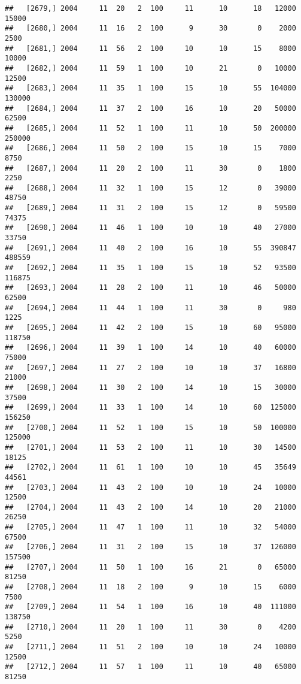 \documentclass{article}\usepackage[]{graphicx}\usepackage[]{color}
\makeatletter
\newenvironment{kframe}{%
 \def\at@end@of@kframe{}%
 \ifinner\ifhmode%
  \def\at@end@of@kframe{\end{minipage}}%
  \begin{minipage}{\columnwidth}%
 \fi\fi%
 \def\FrameCommand##1{\hskip\@totalleftmargin \hskip-\fboxsep
 \colorbox{shadecolor}{##1}\hskip-\fboxsep
     \hskip-\linewidth \hskip-\@totalleftmargin \hskip\columnwidth}%
 \MakeFramed {\advance\hsize-\width
   \@totalleftmargin\z@ \linewidth\hsize
   \@setminipage}}%
 {\par\unskip\endMakeFramed%
 \at@end@of@kframe}
\newenvironment{knitrout}{}{} %
\makeatother
\begin{document}
\begin{knitrout}
\begin{kframe}
\begin{verbatim}
##   [2679,] 2004     11  20   2  100     11      10      18   12000   15000
##   [2680,] 2004     11  16   2  100      9      30       0    2000    2500
##   [2681,] 2004     11  56   2  100     10      10      15    8000   10000
##   [2682,] 2004     11  59   1  100     10      21       0   10000   12500
##   [2683,] 2004     11  35   1  100     15      10      55  104000  130000
##   [2684,] 2004     11  37   2  100     16      10      20   50000   62500
##   [2685,] 2004     11  52   1  100     11      10      50  200000  250000
##   [2686,] 2004     11  50   2  100     15      10      15    7000    8750
##   [2687,] 2004     11  20   2  100     11      30       0    1800    2250
##   [2688,] 2004     11  32   1  100     15      12       0   39000   48750
##   [2689,] 2004     11  31   2  100     15      12       0   59500   74375
##   [2690,] 2004     11  46   1  100     10      10      40   27000   33750
##   [2691,] 2004     11  40   2  100     16      10      55  390847  488559
##   [2692,] 2004     11  35   1  100     15      10      52   93500  116875
##   [2693,] 2004     11  28   2  100     11      10      46   50000   62500
##   [2694,] 2004     11  44   1  100     11      30       0     980    1225
##   [2695,] 2004     11  42   2  100     15      10      60   95000  118750
##   [2696,] 2004     11  39   1  100     14      10      40   60000   75000
##   [2697,] 2004     11  27   2  100     10      10      37   16800   21000
##   [2698,] 2004     11  30   2  100     14      10      15   30000   37500
##   [2699,] 2004     11  33   1  100     14      10      60  125000  156250
##   [2700,] 2004     11  52   1  100     15      10      50  100000  125000
##   [2701,] 2004     11  53   2  100     11      10      30   14500   18125
##   [2702,] 2004     11  61   1  100     10      10      45   35649   44561
##   [2703,] 2004     11  43   2  100     10      10      24   10000   12500
##   [2704,] 2004     11  43   2  100     14      10      20   21000   26250
##   [2705,] 2004     11  47   1  100     11      10      32   54000   67500
##   [2706,] 2004     11  31   2  100     15      10      37  126000  157500
##   [2707,] 2004     11  50   1  100     16      21       0   65000   81250
##   [2708,] 2004     11  18   2  100      9      10      15    6000    7500
##   [2709,] 2004     11  54   1  100     16      10      40  111000  138750
##   [2710,] 2004     11  20   1  100     11      30       0    4200    5250
##   [2711,] 2004     11  51   2  100     10      10      24   10000   12500
##   [2712,] 2004     11  57   1  100     11      10      40   65000   81250

\end{verbatim}
\end{kframe}
\end{knitrout}
\end{document}

